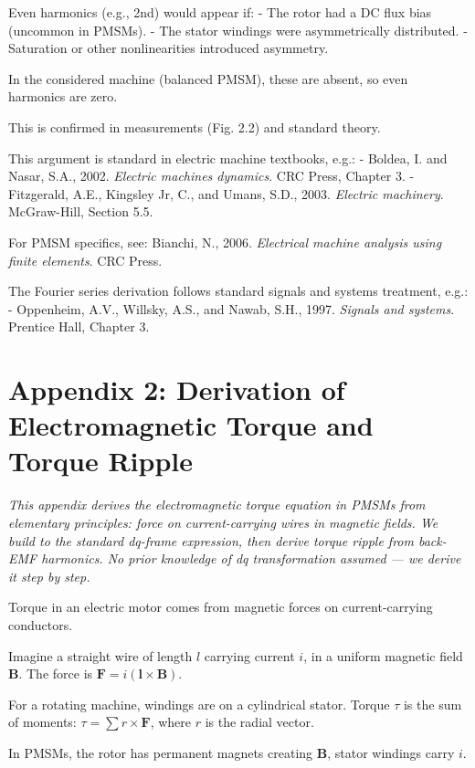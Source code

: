 \documentclass[12pt, a4paper]{article}
\begin{document}
\begin{circuitbox}
Even harmonics (e.g., 2nd) would appear if:
- The rotor had a DC flux bias (uncommon in PMSMs).
- The stator windings were asymmetrically distributed.
- Saturation or other nonlinearities introduced asymmetry.

In the considered machine (balanced PMSM), these are absent, so even harmonics are zero.

This is confirmed in measurements (Fig. 2.2) and standard theory.
\end{circuitbox}

\begin{warningbox}[References]
This argument is standard in electric machine textbooks, e.g.:
- Boldea, I. and Nasar, S.A., 2002. \textit{Electric machines dynamics}. CRC Press, Chapter 3.
- Fitzgerald, A.E., Kingsley Jr, C., and Umans, S.D., 2003. \textit{Electric machinery}. McGraw-Hill, Section 5.5.

For PMSM specifics, see: Bianchi, N., 2006. \textit{Electrical machine analysis using finite elements}. CRC Press.

The Fourier series derivation follows standard signals and systems treatment, e.g.:
- Oppenheim, A.V., Willsky, A.S., and Nawab, S.H., 1997. \textit{Signals and systems}. Prentice Hall, Chapter 3.
\end{warningbox}

\clearpage

\section{Appendix 2: Derivation of Electromagnetic Torque and Torque Ripple}
\label{app:torque_derivation}

\textit{This appendix derives the electromagnetic torque equation in PMSMs from elementary principles: force on current-carrying wires in magnetic fields. We build to the standard dq-frame expression, then derive torque ripple from back-EMF harmonics. No prior knowledge of dq transformation assumed — we derive it step by step.}

\begin{physbox}
Torque in an electric motor comes from magnetic forces on current-carrying conductors.

Imagine a straight wire of length \(l\) carrying current \(i\), in a uniform magnetic field \(\mathbf{B}\). The force is \(\mathbf{F} = i (\mathbf{l} \times \mathbf{B})\).

For a rotating machine, windings are on a cylindrical stator. Torque \(\tau\) is the sum of moments: \(\tau = \sum r \times \mathbf{F}\), where \(r\) is the radial vector.

In PMSMs, the rotor has permanent magnets creating \(\mathbf{B}\), stator windings carry \(i\).
\end{physbox}
\end{document}
